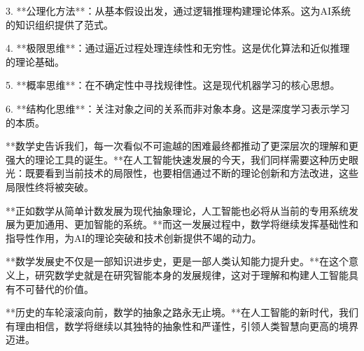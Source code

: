 3. **公理化方法**：从基本假设出发，通过逻辑推理构建理论体系。这为AI系统的知识组织提供了范式。

4. **极限思维**：通过逼近过程处理连续性和无穷性。这是优化算法和近似推理的理论基础。

5. **概率思维**：在不确定性中寻找规律性。这是现代机器学习的核心思想。

6. **结构化思维**：关注对象之间的关系而非对象本身。这是深度学习表示学习的本质。

**数学史告诉我们，每一次看似不可逾越的困难最终都推动了更深层次的理解和更强大的理论工具的诞生。**在人工智能快速发展的今天，我们同样需要这种历史眼光：既要看到当前技术的局限性，也要相信通过不断的理论创新和方法改进，这些局限性终将被突破。

**正如数学从简单计数发展为现代抽象理论，人工智能也必将从当前的专用系统发展为更加通用、更加智能的系统。**而这一发展过程中，数学将继续发挥基础性和指导性作用，为AI的理论突破和技术创新提供不竭的动力。

**数学发展史不仅是一部知识进步史，更是一部人类认知能力提升史。**在这个意义上，研究数学史就是在研究智能本身的发展规律，这对于理解和构建人工智能具有不可替代的价值。

**历史的车轮滚滚向前，数学的抽象之路永无止境。**在人工智能的新时代，我们有理由相信，数学将继续以其独特的抽象性和严谨性，引领人类智慧向更高的境界迈进。